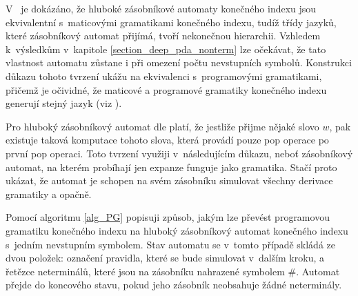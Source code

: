 
V~\cite{Meduna:DeepPDA} je dokázáno, že hluboké zásobníkové automaty konečného indexu jsou ekvivalentní s~maticovými gramatikami konečného indexu, tudíž třídy jazyků, které zásobníkový automat přijímá, tvoří nekonečnou hierarchii. Vzhledem k~výsledkům v~kapitole \ref{section_deep_pda_nonterm} lze očekávat, že tato vlastnost automatu zůstane i při omezení počtu nevstupních symbolů. Konstrukci důkazu tohoto tvrzení ukážu na ekvivalenci s~programovými gramatikami, přičemž je očividné, že maticové a programové gramatiky konečného indexu generují stejný jazyk (viz \cite{Dassow:RegulatedRewriting}).

Pro hluboký zásobníkový automat dle \cite{Meduna:DeepPDA} platí, že jestliže přijme nějaké slovo $w$, pak existuje taková komputace tohoto slova, která provádí pouze pop operace po první pop operaci. Toto tvrzení využiji v~následujícím důkazu, neboť zásobníkový automat, na kterém probíhají jen expanze funguje jako gramatika. Stačí proto ukázat, že automat je schopen na svém zásobníku simulovat všechny derivace gramatiky a opačně.

Pomocí algoritmu \ref{alg_PG} popisuji způsob, jakým lze převést programovou gramatiku konečného indexu na hluboký zásobníkový automat konečného indexu s~jedním nevstupním symbolem. Stav automatu se v~tomto případě skládá ze dvou položek: označení pravidla, které se bude simulovat v~dalším kroku, a řetězce neterminálů, které jsou na zásobníku nahrazené symbolem $\#$. Automat přejde do koncového stavu, pokud jeho zásobník neobsahuje žádné neterminály.

